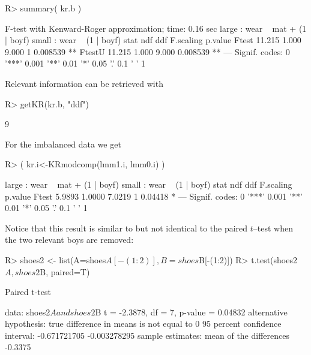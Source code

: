 \documentclass[11pt]{article}
\begin{document}
\begin{Schunk}
\begin{Sinput}
R> summary( kr.b )
\end{Sinput}
\begin{Soutput}
F-test with Kenward-Roger approximation; time: 0.16 sec
large : wear ~ mat + (1 | boyf)
small : wear ~ (1 | boyf)
         stat    ndf    ddf F.scaling  p.value   
Ftest  11.215  1.000  9.000         1 0.008539 **
FtestU 11.215  1.000  9.000           0.008539 **
---
Signif. codes:  0 '***' 0.001 '**' 0.01 '*' 0.05 '.' 0.1 ' ' 1
\end{Soutput}
\end{Schunk}

Relevant information can be retrieved with

\begin{Schunk}
\begin{Sinput}
R> getKR(kr.b, "ddf")
\end{Sinput}
\begin{Soutput}
[1] 9
\end{Soutput}
\end{Schunk}

For the imbalanced data we get
\begin{Schunk}
\begin{Sinput}
R> ( kr.i<-KRmodcomp(lmm1.i, lmm0.i) )
\end{Sinput}
\begin{Soutput}
large : wear ~ mat + (1 | boyf)
small : wear ~ (1 | boyf)
        stat    ndf    ddf F.scaling p.value  
Ftest 5.9893 1.0000 7.0219         1 0.04418 *
---
Signif. codes:  0 '***' 0.001 '**' 0.01 '*' 0.05 '.' 0.1 ' ' 1
\end{Soutput}
\end{Schunk}

Notice that this result is similar to but not identical to the paired
$t$--test when the two relevant boys are removed:

\begin{Schunk}
\begin{Sinput}
R> shoes2 <- list(A=shoes$A[-(1:2)], B=shoes$B[-(1:2)])
R> t.test(shoes2$A, shoes2$B, paired=T)
\end{Sinput}
\begin{Soutput}
	Paired t-test

data:  shoes2$A and shoes2$B
t = -2.3878, df = 7, p-value = 0.04832
alternative hypothesis: true difference in means is not equal to 0
95 percent confidence interval:
 -0.671721705 -0.003278295
sample estimates:
mean of the differences 
                -0.3375 
\end{Soutput}
\end{Schunk}
\end{document}
